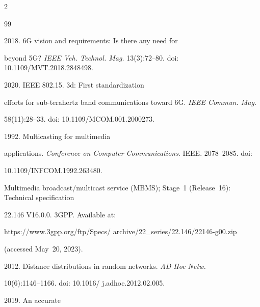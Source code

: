   \begin{multicols}{2}



\renewcommand{\bibname}{\protect\rmfamily References}




{\small\frenchspacing

 {%


 \begin{thebibliography}{99}


   2018. 6G vision and requirements: Is there any need for 

beyond 5G? \textit{IEEE Veh. Technol. Mag.} 13(3):72--80. doi: 10.1109/MVT.2018.2848498.


   2020. IEEE 802.15. 3d: First standardization 

efforts for sub-terahertz band communications toward 6G. \textit{IEEE Commun. Mag.} 

58(11):28--33. doi: 10.1109/MCOM.001.2000273. 


   1992. Multicasting for multimedia 

applications. \textit{Conference on Computer Communications}. IEEE. 2078--2085. doi: 

10.1109/INFCOM.1992.263480. 


Multimedia broadcast/multicast service (MBMS); Stage~1 (Release~16): Technical specification 

22.146 V16.0.0. 3GPP. Available at:  {\sf 

https://www.3gpp.org/ftp/Specs/ archive/22\_series/22.146/22146-g00.zip} (accessed May~20, 2023).


 2012. Distance distributions in random networks. \textit{AD Hoc Netw.} 

10(6):1146--1166. doi: 10.1016/ j.adhoc.2012.02.005.


   2019. An accurate 


\end{thebibliography}}}
\end{multicols}
